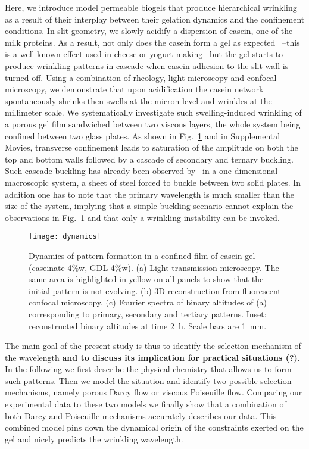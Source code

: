 \documentclass[twocolumn,superscriptaddress,showpacs,preprintnumbers,
amsmath,amssymb,prl]{revtex4-1}
\newcommand{\seb}[1]{\textbf{\color{blue}#1}} %
\begin{document}
Here, we introduce model permeable biogels that produce hierarchical wrinkling as a result of their interplay between their gelation dynamics and the confinement conditions. In slit geometry, we slowly acidify a dispersion of casein, one of the milk proteins.  As a result, not only does the casein form a gel as expected~\cite{Bremer1989} --this is a well-known effect used in cheese or yogurt making-- but the gel starts to produce wrinkling patterns in cascade when casein adhesion to the slit wall is turned off. Using a combination of rheology, light microscopy and confocal microscopy, we demonstrate that upon acidification the casein network spontaneously shrinks then swells at the micron level and wrinkles at the millimeter scale. We systematically investigate such swelling-induced wrinkling of a porous gel film sandwiched between two viscous layers, the whole system being confined between two glass plates. As shown in Fig.~\ref{fig:dynamics} and in Supplemental Movies, transverse confinement leads to saturation of the amplitude on both the top and bottom walls followed by a cascade of secondary and ternary buckling. Such cascade buckling has already been observed by~\cite{Roman1999} in a one-dimensional macroscopic system, a sheet of steel forced to buckle between two solid plates. In addition one has to note that the primary wavelength is much smaller than the size of the system, implying that a simple buckling scenario cannot explain the observations in Fig.~\ref{fig:dynamics} and that only a wrinkling instability can be invoked. 

\begin{figure}[ht!]
	\texttt{[image: dynamics]}%
	\caption{Dynamics of pattern formation in a confined film of casein gel (caseinate 4\%w, GDL 4\%w). (a) Light transmission microscopy. The same area is highlighted in yellow on all panels to show that the initial pattern is not evolving. (b) 3D reconstruction from fluorescent confocal microscopy. (c) Fourier spectra of binary altitudes of (a) corresponding to primary, secondary and tertiary patterns. Inset: reconstructed binary altitudes at time \SI{2}{\hour}. Scale bars are \SI{1}{\milli\metre}.}%
	\label{fig:dynamics}%
\end{figure}

The main goal of the present study is thus to identify the selection mechanism of the wavelength \seb{and to discuss its implication for practical situations (?)}. In the following we first describe the physical chemistry that allows us to form such patterns. Then we  model the situation and identify two possible selection mechanisms, namely porous Darcy flow or viscous Poiseuille flow. Comparing our experimental data to these two models we finally show that a combination of both Darcy and Poiseuille mechanisms accurately describes our data. This combined model pins down the dynamical origin of the constraints exerted on the gel and nicely predicts the wrinkling wavelength.
\end{document}

